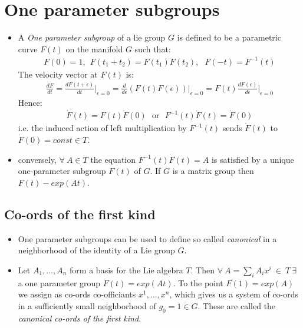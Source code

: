 \documentclass[11pt]{article}
\numberwithin{equation}{section}
\begin{document}
\newpage 
\section{One parameter subgroups} 
\begin{itemize}
  \item A \emph{One parameter subgroup} of a lie group $G$ is defined to be a parametric curve $F(t)$ on the manifold $G$ such that:
  \begin{align*}
    F(0) = 1,~~F(t_1+t_2) = F(t_{1})F(t_2),~~~F(-t)= F^{-1}(t)
  \end{align*}
  The velocity vector at $F(t)$ is:
  \begin{align*}
    \frac{dF}{dt} = \frac{dF(t+\epsilon)}{dt}\bigg\vert_{\epsilon=0} = \frac{d}{d\epsilon}(F(t)F(\epsilon))\bigg\vert_{\epsilon=0} = F(t)\frac{dF(\epsilon)}{d\epsilon}\bigg\vert_{\epsilon=0}
  \end{align*}
  Hence:
  \begin{align*}
    \dot{F}(t) = F(t)\dot{F}(0) ~~~\text{or}~~~F^{-1}(t)\dot{F}(t) = \dot{F}(0)
  \end{align*}
  i.e. the induced action of left multiplication by $F^{-1}(t)$ sends $\dot{F}(t)$ to $\dot{F}(0) = const \in T $. 

  \item conversely, $\forall ~ A \in T$ the equation $F^{-1}(t)\dot{F}(t) = A$ is satisfied by a unique one-parameter subgroup $F(t)$ of $G$. If $G$ is a matrix group then $F(t) - exp (At)$.  
\end{itemize}

\subsection{Co-ords of the first kind}
\begin{itemize}
  \item One parameter subgroups can be used to define so called \emph{canonical} in a neighborhood of the identity of a Lie group $G$. 

  \item Let $A_1,\ldots,A_n$ form a basis for the Lie algebra $T$. Then $\forall~ A = \sum_iA_ix^i ~ \in ~ T ~\exists $ a one parameter group $F(t) = exp(At)$. To the point $F(1)= exp(A)$ we assign as co-ords co-officiants $x^1,\ldots,x^n$, which gives us a system of co-ords in a sufficiently small neighborhood of $g_0 =1 \in G$. These are called the \emph{canonical co-ords of the first kind}. 
\end{itemize}
\end{document}
